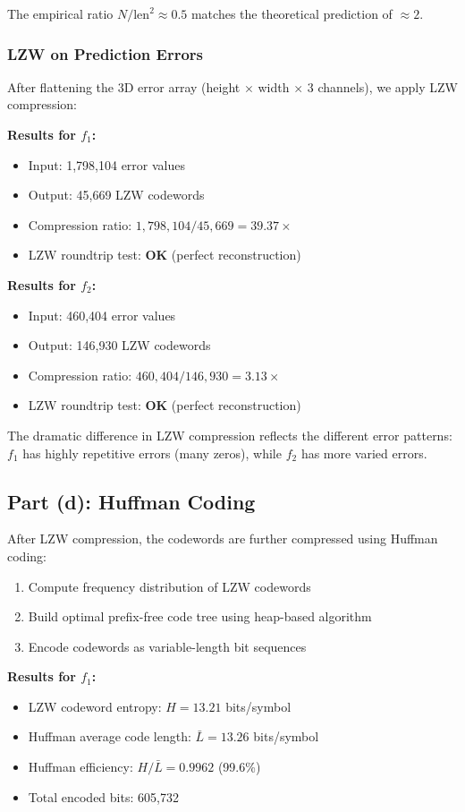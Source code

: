 \documentclass[11pt,a4paper]{article}
\begin{document}
The empirical ratio $N/\text{len}^2 \approx 0.5$ matches the theoretical prediction of $\approx 2$.

\subsubsection{LZW on Prediction Errors}
After flattening the 3D error array (height $\times$ width $\times$ 3 channels), we apply LZW compression:

\textbf{Results for $f_1$:}
\begin{itemize}
    \item Input: 1,798,104 error values
    \item Output: 45,669 LZW codewords
    \item Compression ratio: $1,798,104 / 45,669 = 39.37\times$
    \item LZW roundtrip test: \textbf{OK} (perfect reconstruction)
\end{itemize}

\textbf{Results for $f_2$:}
\begin{itemize}
    \item Input: 460,404 error values
    \item Output: 146,930 LZW codewords
    \item Compression ratio: $460,404 / 146,930 = 3.13\times$
    \item LZW roundtrip test: \textbf{OK} (perfect reconstruction)
\end{itemize}

The dramatic difference in LZW compression reflects the different error patterns: $f_1$ has highly repetitive errors (many zeros), while $f_2$ has more varied errors.

\subsection{Part (d): Huffman Coding}
After LZW compression, the codewords are further compressed using Huffman coding:
\begin{enumerate}
    \item Compute frequency distribution of LZW codewords
    \item Build optimal prefix-free code tree using heap-based algorithm
    \item Encode codewords as variable-length bit sequences
\end{enumerate}

\textbf{Results for $f_1$:}
\begin{itemize}
    \item LZW codeword entropy: $H = 13.21$ bits/symbol
    \item Huffman average code length: $\bar{L} = 13.26$ bits/symbol
    \item Huffman efficiency: $H/\bar{L} = 0.9962$ (99.6\%)
    \item Total encoded bits: 605,732
\end{itemize}
\end{document}

